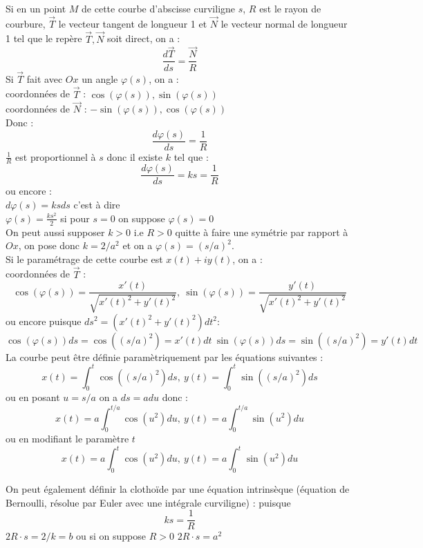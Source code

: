 \documentclass[a4paper,11pt]{book}
\begin{document}
Si en un point $M$ de cette courbe d'abscisse curviligne $s$,  $R$ est le rayon
de courbure, $\overrightarrow T$ le vecteur tangent de longueur 1 et 
$\overrightarrow N$ le vecteur normal de longueur 1  tel que le rep\`ere $\overrightarrow T,\overrightarrow N$ soit direct, on a :\\
$$\frac{d\overrightarrow T}{ds}=\frac{\overrightarrow N}{R}$$
Si $\overrightarrow T$ fait avec $Ox$ un angle $\varphi(s)$, on a :\\
coordonn\'ees de $\overrightarrow T$ : $\cos(\varphi(s)),\sin(\varphi(s))$\\
coordonn\'ees de $\overrightarrow N$ : $-\sin(\varphi(s)),\cos(\varphi(s))$\\
Donc :\\
$$\frac{d\varphi(s)}{ds}=\frac{1}{R}$$
$\frac{1}{R}$ est proportionnel \`a $s$ donc il existe $k$ tel que :
$$\frac{d\varphi(s)}{ds}=ks=\frac{1}{R}$$
 ou encore :\\
$d\varphi(s)=ksds$ c'est \`a dire \\
$\varphi(s)=\frac{ks^2}{2}$ si pour $s=0$ on suppose $\varphi(s)=0$\\
On peut aussi supposer $k>0$ i.e $R>0$ quitte \`a faire une sym\'etrie par 
rapport \`a $Ox$, on pose donc $k=2/a^2$ et on a $\varphi(s)=(s/a)^2$.\\
Si le param\'etrage de cette courbe est $x(t)+iy(t)$, on a :\\
coordonn\'ees de $\overrightarrow T$ : \\
$$\cos(\varphi(s))=\frac{x'(t)}{\sqrt{x'(t)^2+y'(t)^2}},\ \sin(\varphi(s))=\frac{y'(t)}{\sqrt{x'(t)^2+y'(t)^2}}$$
ou encore puisque $ds^2=(x'(t)^2+y'(t)^2)dt^2$:\\
$$\cos(\varphi(s))ds=\cos((s/a)^2)=x'(t)dt\  \sin(\varphi(s))ds=\sin((s/a)^2)=y'(t)dt$$
La courbe peut \^etre d\'efinie param\`etriquement par les \'equations 
suivantes :
$$x(t)=\int_0^t\cos((s/a)^2)ds,\ y(t)=\int_0^t\sin((s/a)^2)ds$$ 
ou en posant $u=s/a$ on a $ds=adu$ donc :\\
$$x(t)=a\int_0^{t/a}\cos(u^2)du,\ y(t)=a\int_0^{t/a}\sin(u^2)du$$ 
ou en modifiant le param\`etre $t$
$$x(t)=a\int_0^{t}\cos(u^2)du,\ y(t)=a\int_0^{t}\sin(u^2)du$$ 

On peut \'egalement d\'efinir la clotho\"{i}de par une \'equation intrins\`eque
 (\'equation de Bernoulli, r\'esolue par Euler avec une int\'egrale curviligne) :
puisque $$ks=\frac{1}{R}$$
    $2R \cdot s = 2/k=b$ ou si on suppose $R>0$ $2R \cdot s =a^2$
\end{document}
